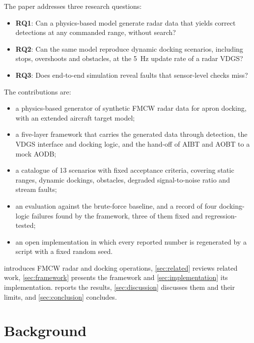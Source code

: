 \documentclass[conference]{IEEEtran}
\begin{document}
The paper addresses three research questions:
\begin{itemize}
  \item \textbf{RQ1}: Can a physics-based model generate radar data that yields correct detections at any commanded range, without search?
  \item \textbf{RQ2}: Can the same model reproduce dynamic docking scenarios, including stops, overshoots and obstacles, at the \SI{5}{\hertz} update rate of a radar VDGS?
  \item \textbf{RQ3}: Does end-to-end simulation reveal faults that sensor-level checks miss?
\end{itemize}

The contributions are:
\begin{itemize}
  \item a physics-based generator of synthetic FMCW radar data for apron docking, with an extended aircraft target model;
  \item a five-layer framework that carries the generated data through detection, the VDGS interface and docking logic, and the hand-off of AIBT and AOBT to a mock AODB;
  \item a catalogue of 13 scenarios with fixed acceptance criteria, covering static ranges, dynamic dockings, obstacles, degraded signal-to-noise ratio and stream faults;
  \item an evaluation against the brute-force baseline, and a record of four docking-logic failures found by the framework, three of them fixed and regression-tested;
  \item an open implementation in which every reported number is regenerated by a script with a fixed random seed.
\end{itemize}

 introduces FMCW radar and docking operations, \cref{sec:related} reviews related work, \cref{sec:framework} presents the framework and \cref{sec:implementation} its implementation.  reports the results, \cref{sec:discussion} discusses them and their limits, and \cref{sec:conclusion} concludes.

\section{Background}
\label{sec:background}
\end{document}
